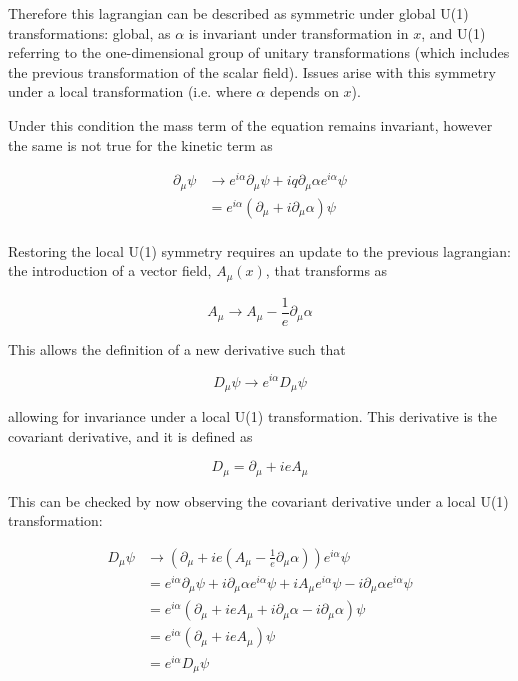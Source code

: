 \documentclass[12pt,a4paper,epsf,portrait,times,epsfig]{report}
\begin{document}
	Therefore this lagrangian can be described as symmetric under global U(1) transformations: global, as $\alpha$ is invariant under transformation in $x$, and U(1) referring to the one-dimensional group of unitary transformations (which includes the previous transformation of the scalar field). Issues arise with this symmetry under a local transformation (i.e. where $\alpha$ depends on $x$). 

	Under this condition the mass term of the equation remains invariant, however the same is not true for the kinetic term as

	\begin{equation}
		\begin{split}
		\partial_{\mu}\psi &\rightarrow e^{i\alpha}\partial_{\mu}\psi+iq\partial_{\mu}\alpha e^{i\alpha}\psi \\
		&= e^{i\alpha}(\partial_{\mu}+i\partial_{\mu}\alpha)\psi \\
		\end{split}
	\end{equation}

	Restoring the local U(1) symmetry requires an update to the previous lagrangian: the introduction of a vector field, $A_{\mu}(x)$, that transforms as 
	
	\begin{equation}
		A_{\mu} \rightarrow A_{\mu} - \frac{1}{e} \partial_{\mu} \alpha
	\end{equation}

	This allows the definition of a new derivative such that

	\begin{equation}
		D_{\mu}\psi \rightarrow e^{i\alpha}D_{\mu}\psi
	\end{equation}

	allowing for invariance under a local U(1) transformation. This derivative is the covariant derivative, and it is defined as

	\begin{equation}
		D_{\mu} = \partial_{\mu} + ieA_{\mu}
	\end{equation}

	This can be checked by now observing the covariant derivative under a local U(1) transformation:

	\begin{equation}
		\begin{split}
			D_{\mu}\psi &\rightarrow (\partial_{\mu}+ie(A_{\mu}-\frac{1}{e}\partial_{\mu}\alpha))e^{i\alpha}\psi \\
			&= e^{i\alpha}\partial_{\mu}\psi + i\partial_{\mu}\alpha e^{i \alpha}\psi + iA_{\mu}e^{i\alpha}\psi - i\partial_{\mu}\alpha e^{i\alpha}\psi \\
			&= e^{i\alpha}(\partial_{\mu} + ieA_{\mu} + i\partial_{\mu}\alpha - i\partial_{\mu}\alpha)\psi \\
			&= e^{i\alpha}(\partial_{\mu}+ieA_{\mu})\psi \\
			&= e^{i\alpha}D_{\mu}\psi
		\end{split}
	\end{equation}
\end{document}
